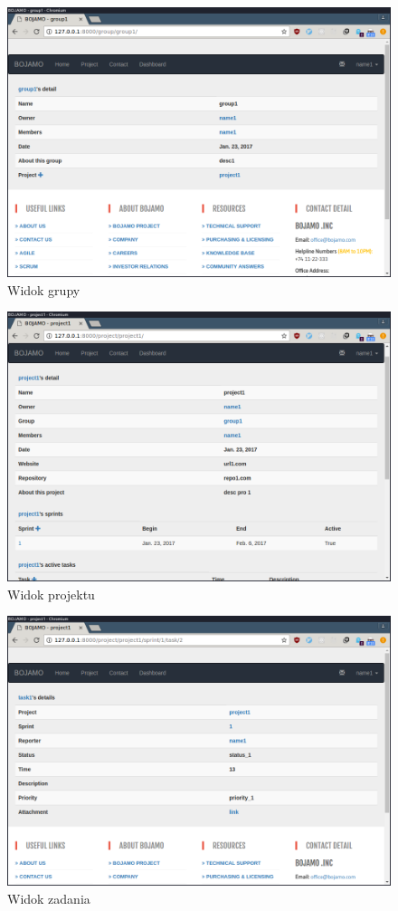 \documentclass[12pt]{article}
\begin{document}
\begin{figure}[htp]
\centering
\includegraphics[scale=.5]{img/group.png}
\caption{Widok grupy}
\label{}
\end{figure}

\begin{figure}[htp]
\centering
\includegraphics[scale=.5]{img/project.png}
\caption{Widok projektu}
\label{}
\end{figure}

\begin{figure}[htp]
\centering
\includegraphics[scale=.5]{img/task.png}
\caption{Widok zadania}
\label{}
\end{figure}
\end{document}
